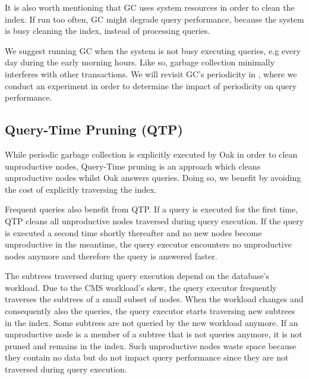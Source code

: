 \documentclass[abstracton,12pt]{scrartcl}
\theoremstyle{definition}
\begin{document}
It is also worth mentioning that GC uses system resources in order to clean the
index. If run too often, GC might degrade query performance, because the system
is busy cleaning the index, instead of processing queries.

We suggest running GC when the system is not busy executing queries, e.g every
day during the 
early morning hours. Like so, garbage collection minimally interferes with other
transactions. We will revisit GC's periodicity in , where we
conduct an experiment in order to determine the impact of periodicity on
query performance. 


\subsection{Query-Time Pruning (QTP)}

While periodic garbage collection is explicitly executed by Oak in order to
clean unproductive nodes, Query-Time pruning is an approach which cleans
unproductive nodes whilst Oak answers queries. Doing so, we benefit by
avoiding the cost of explicitly traversing the index.  

Frequent queries also benefit from QTP. If a query is executed for the first
time, QTP cleans all unproductive nodes traversed during query execution.
If the query is executed a second time shortly thereafter and  no new nodes
become unproductive in the meantime, the query executor encounters no
unproductive nodes anymore and therefore the query is answered faster.

The subtrees traversed during query execution depend on the database's workload.
Due to the CMS workload's skew, the query executor frequently traverses the
subtrees of a small subset of nodes. When the workload changes and consequently
also the queries, the query executor starts traversing new subtrees in the index.
Some subtrees are not queried by the new workload anymore. If an unproductive
node is a member of a subtree that is not queries anymore, it is not pruned and
remains in the index.
Such unproductive nodes waste space because they contain no data but do not
impact query performance since they are not traversed during query execution.

\end{document}
